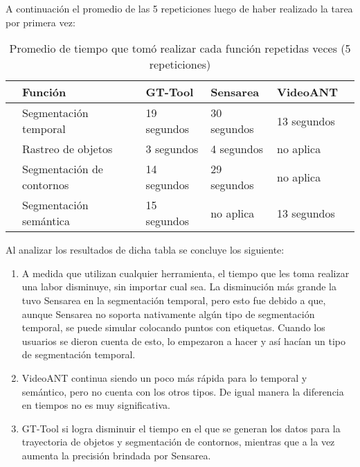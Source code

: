 A continuación el promedio de las 5 repeticiones luego de haber realizado la tarea por primera vez:


\begin{table}[h]\centering
	
	\caption{Promedio de tiempo que tomó realizar cada función repetidas veces (5 repeticiones)}
	\label{table:results2}
	
	\begin{tabular}{@{}cC{3cm}C{3cm}C{3cm}C{3cm}c@{}}\toprule
		
		& Función & GT-Tool & Sensarea & VideoANT&\\ \midrule
		
		& Segmentación temporal  & 19 segundos & 30 segundos & 13 segundos & \\
		
		& Rastreo de objetos & 3 segundos & 4 segundos & no aplica & \\
		
		& Segmentación de contornos & 14 segundos  & 29 segundos & no aplica & \\
		
		& Segmentación semántica & 15 segundos  & no aplica & 13 segundos & \\ 
		
		\bottomrule
		
	\end{tabular}
	
\end{table}

Al analizar los resultados de dicha tabla se concluye los siguiente:

\begin{enumerate}
	
\item A medida que utilizan cualquier herramienta, el tiempo que les toma realizar una labor disminuye, sin importar cual sea. La disminución más grande la tuvo Sensarea en la segmentación temporal, pero esto fue debido a que, aunque Sensarea no soporta nativamente algún tipo de segmentación temporal, se puede simular colocando puntos con etiquetas. Cuando los usuarios se dieron cuenta de esto, lo empezaron a hacer y así hacían un tipo de segmentación temporal.

\item VideoANT continua siendo un poco más rápida para lo temporal y semántico, pero no cuenta con los otros tipos. De igual manera la diferencia en tiempos no es muy significativa.

\item GT-Tool si logra disminuir el tiempo en el que se generan los datos para la trayectoria de objetos y segmentación de contornos, mientras que a la vez aumenta la precisión brindada por Sensarea.

\end{enumerate}